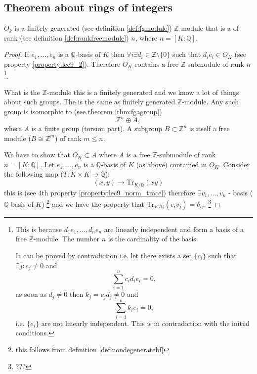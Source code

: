 \subsection{Theorem about rings of integers}
\begin{theorem}
  $O_k$ is a finitely generated (see definition \ref{def:fgmodule})
  $\mathbb{Z}$-module that is a  of
  rank (see definition \ref{def:rankfreemodule}) $n$, where $n=
  \left[K:\mathbb{Q}\right]$. 
  \label{thm:lec9_1}
  \begin{proof}
    If $e_1, \dots, e_n$ is a $\mathbb{Q}$-basis of $K$ then
    $\forall i \exists d_i \in \mathbb{Z} \setminus
    \{0\}$ such that $d_i e_i \in O_K$ (see property
    \ref{property:lec9_2}). Therefore $O_K$ contains a free
    $\mathbb{Z}$-submodule of rank $n$
    \footnote{
      This is because $d_1 e_1, \dots, d_n e_n$ are linearly
      independent and form a basis of a free $\mathbb{Z}$-module. The
      number $n$ is the cardinality of the basis.

      It can be proved by contradiction i.e. let there exists a set
      $\{c_i\}$ such that $\exists j: c_j \ne 0$ and
      \[
      \sum_{i=1}^n c_i d_i e_i = 0,
      \]
      as soon as $d_j \ne 0$ then $k_j = c_j d_j \ne 0$ and
      \[
      \sum_{i=1}^n k_i e_i = 0,
      \]
      i.e. $\{e_i\}$ are not linearly independent. This is in
      contradiction with the initial conditions.
    }.

    What is the $\mathbb{Z}$-module this is a finitely generated
     and we know a lot of things about such
    groups. The  is the same as
    finitely generated $\mathbb{Z}$-module. Any such group is isomorphic
    to (see theorem \ref{thm:fgagroup})
    \[
    \mathbb{Z}^n \oplus A,
    \]
    where $A$ is a finite group (torsion part). A subgroup
    $B \subset \mathbb{Z}^n$ is itself a free module ($B \cong \mathbb{Z}^m$)
    of rank $m \le n$.

    We have to show that $O_K \subset A$ where $A$ is a free
    $\mathbb{Z}$-submodule of rank $n = \left[K:\mathbb{Q}\right]$.
    Let $e_1, \dots, e_n$ is a $\mathbb{Q}$-basis of $K$ (as above)
    contained in $O_K$. Consider the following map
    ($T: K \times K \to \mathbb{Q}$):
    \[
    (x,y) \to \mathrm{Tr}_{K/\mathbb{Q}}\left(xy\right) 
    \]
    this is
     (see 4th property
    \ref{property:lec9_norm_trace}) therefore $\exists v_1, \dots,
    v_n$ -  basis ($\mathbb{Q}$-basis of $K$)
    \footnote{
      this follows from definition \ref{def:nondegeneratebf}
    }
    and we have the property that
    $\mathrm{Tr}_{K/\mathbb{Q}}\left(e_i v_j\right) = \delta_{ij}$.
    \footnote{
      ???
    }


\end{proof}
\end{theorem}
